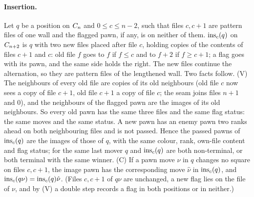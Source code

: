 \begin{wallproof}
\paragraph{Insertion.}
Let $q$ be a position on $C_{n}$ and $0\le c\le n-2$, such that files $c,c+1$ are pattern files of one wall and the flagged pawn, if
any, is on neither of them. $\operatorname{ins}_c(q)$ on $C_{n+2}$ is $q$ with two new files placed after file $c$, holding copies of the contents
of files $c+1$ and $c$: old file $f$ goes to $f$ if $f\le c$ and to $f+2$ if $f\ge c+1$; a flag goes with its pawn, and the same side
holds the right. The new files continue the alternation, so they are pattern files of the lengthened wall. Two facts follow.
(V) The neighbours of every old file are copies of its old neighbours (old file $c$ now sees a copy of file $c+1$, old file $c+1$ a copy
of file $c$; the seam joins files $n+1$ and $0$), and the neighbours of the flagged pawn are the images of its old neighbours. So every old pawn has the same three files and
the same flag status: the same moves and the same status. A new pawn has an enemy pawn two ranks ahead on both neighbouring files and is
not passed. Hence the passed pawns of $\operatorname{ins}_c(q)$ are the images of those of $q$, with the same colour, rank, own-file content and
flag status; for the same last mover $q$ and $\operatorname{ins}_c(q)$ are both non-terminal, or both terminal with the same winner.
(C) If a pawn move $\nu$ in $q$ changes no square on files $c,c+1$, the image pawn has the corresponding move $\hat\nu$ in $\operatorname{ins}_c(q)$, and
$\operatorname{ins}_c(q\nu)=\operatorname{ins}_c(q)\hat\nu$. (Files $c,c+1$ of $q\nu$ are unchanged, a new flag lies on the file of $\nu$, and by (V) a double step
records a flag in both positions or in neither.)


\end{wallproof}
